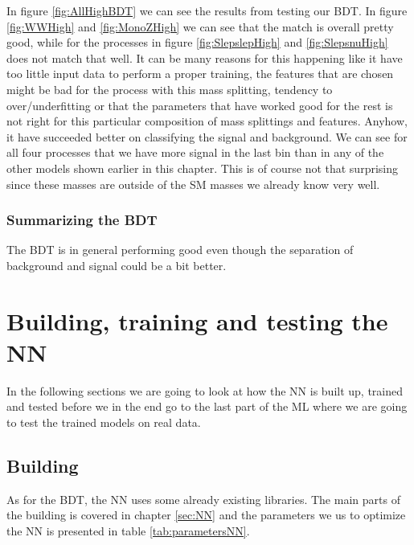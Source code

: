 In figure \ref{fig:AllHighBDT} we can see the results from testing our BDT. In figure \ref{fig:WWHigh} and \ref{fig:MonoZHigh} we can see that the match is overall pretty good, while for the processes in figure \ref{fig:SlepslepHigh} and \ref{fig:SlepsnuHigh} does not match that well. It can be many reasons for this happening like it have too little input data to perform a proper training, the features that are chosen might be bad for the process with this mass splitting, tendency to over/underfitting or that the parameters that have worked good for the rest is not right for this particular composition of mass splittings and features. Anyhow, it have succeeded better on classifying the signal and background. We can see for all four processes that we have more signal in the last bin than in any of the other models shown earlier in this chapter. This is of course not that surprising since these masses are outside of the SM masses we already know very well.



\subsubsection{Summarizing the BDT}
The BDT is in general performing good even though the separation of background and signal could be a bit better. 




\section{Building, training and testing the NN}

In the following sections we are going to look at how the NN is built up, trained and tested before we in the end go to the last part of the ML where we are going to test the trained models on real data.

\subsection{Building}
As for the BDT, the NN uses some already existing libraries. The main parts of the building is covered in chapter \ref{sec:NN} and the parameters we us to optimize the NN is presented in table \ref{tab:parametersNN}.

